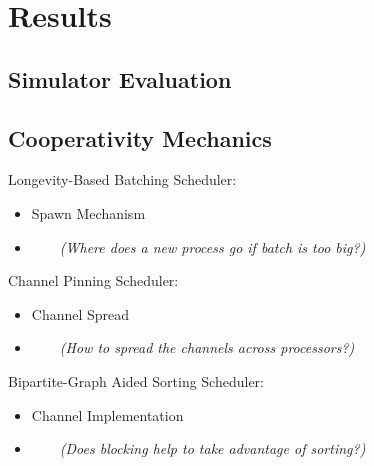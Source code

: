 \section{Results}

\subsection{Simulator Evaluation}

\begin{slide}

\end{slide}

\subsection{Cooperativity Mechanics}


\begin{slide}
    Longevity-Based Batching Scheduler:
    \begin{itemize}
    \item Spawn Mechanism 
    \item[] ~~~~{\it (Where does a new process go if batch is too big?)}
    \end{itemize}
    
    Channel Pinning Scheduler:
    \begin{itemize}
    \item Channel Spread 
    \item[] ~~~~{\it (How to spread the channels across processors?)}
    \end{itemize}

    Bipartite-Graph Aided Sorting Scheduler:
    \begin{itemize}
    \item Channel Implementation 
    \item[] ~~~~{\it (Does blocking help to take advantage of sorting?)}
    \end{itemize}

\end{slide}

